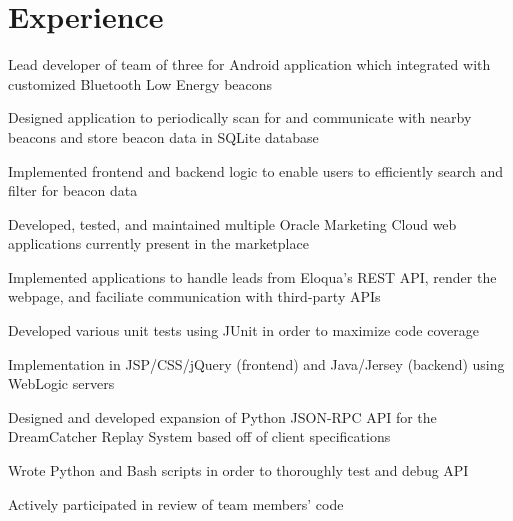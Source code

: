 \documentclass[letterpaper]{deedy-resume}
\begin{document}
\hfill
%
%
\begin{minipage}[t]{0.66\textwidth}

\section{Experience}


\vspace{\topsep}
\begin{tightitemize}
\item Lead developer of team of three for Android application which integrated with customized Bluetooth Low Energy beacons
\item Designed application to periodically scan for and communicate with nearby beacons and store beacon data in SQLite database
\item Implemented frontend and backend logic to enable users to efficiently search and filter for beacon data
\end{tightitemize}

\sectionspace


\begin{tightitemize}
\item Developed, tested, and maintained multiple Oracle Marketing Cloud web applications currently present in the marketplace
\item Implemented applications to handle leads from Eloqua's REST API, render the webpage, and faciliate communication with third-party APIs
\item Developed various unit tests using JUnit in order to maximize code coverage
\item Implementation in JSP/CSS/jQuery (frontend) and Java/Jersey (backend) using WebLogic servers
\end{tightitemize}

\sectionspace


\begin{tightitemize}
\item Designed and developed expansion of Python JSON-RPC API for the DreamCatcher Replay System based off of client specifications
\item Wrote Python and Bash scripts in order to thoroughly test and debug API
\item Actively participated in review of team members' code
\end{tightitemize}


\end{minipage}
\end{document}
